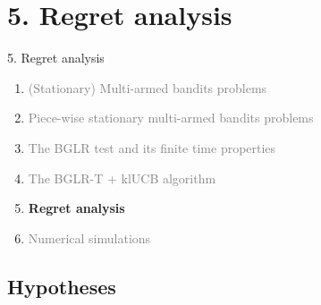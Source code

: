 \documentclass[11pt,english,ignorenonframetext,]{beamer}
\begin{document}
\section{\hfill{}5. Regret analysis\hfill{}}

\begin{frame}{5. Regret analysis}

  \begin{enumerate}
    \item
    \textcolor{gray}{
      (Stationary) Multi-armed bandits problems
    }
    \vspace*{15pt}

    \item
    \textcolor{gray}{
      Piece-wise stationary multi-armed bandits problems
    }
    \vspace*{15pt}

    \item
    \textcolor{gray}{
      The BGLR test and its finite time properties
    }
    \vspace*{15pt}

    \item
    \textcolor{gray}{
      The BGLR-T + klUCB algorithm
    }
    \vspace*{15pt}

    \item
    \alert{\textbf{%
      Regret analysis
    }}
    \vspace*{15pt}

    \item
    \textcolor{gray}{
      Numerical simulations
    }
  \end{enumerate}

\end{frame}

\subsection{\hfill{}Hypotheses\hfill{}}
\end{document}
